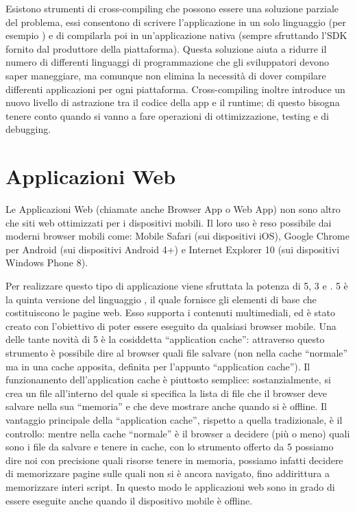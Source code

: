         Esistono strumenti di cross-com\-pil\-ing che possono essere una soluzione
        parziale del problema, essi consentono di scrivere l'applicazione in un solo
        linguaggio (per esempio \js{}) e di compilarla poi in un'applicazione
        nativa (sempre sfruttando l'SDK fornito dal produttore della
        piattaforma). Questa soluzione aiuta a ridurre il numero di differenti
        linguaggi di programmazione che gli sviluppatori devono saper maneggiare,
        ma comunque non elimina la necessità di dover compilare differenti
        applicazioni per ogni piattaforma. Cross-com\-pil\-ing inoltre introduce un
        nuovo livello di astrazione tra il codice della app e il run\-time; di
        questo bisogna tenere conto quando si vanno a fare operazioni di
        ottimizzazione, test\-ing e di de\-bug\-ging.

    \section{Applicazioni Web}
    \label{sec:webapp}
        Le Applicazioni Web (chiamate anche \mbox{Browser} App o Web App) non sono
        altro che siti web ottimizzati per i dispositivi mobili. Il loro uso è
        reso possibile dai moderni \mbox{browser} mobili come: Mobile Safari (sui
        dispositivi iOS), Google Chrome per Android (sui dispositivi Android 4+)
        e Internet Explorer 10 (sui dispositivi Windows Phone 8).\clearpage

        Per realizzare questo tipo di applicazione viene sfruttata la potenza di
        \html{}5, \css{}3 e \js{}. \html{}5 è la quinta versione del linguaggio
        \html{}, il quale fornisce gli elementi di base che costituiscono le pagine
        web. Esso supporta i contenuti multimediali, ed è stato creato con
        l'obiettivo di poter essere eseguito da qualsiasi \mbox{browser}
        mobile\citep{White:Native-vs-Html}. Una delle tante novità di \html{}5 è la
        cosiddetta ``ap\-pli\-ca\-tion \mbox{cache}'': attraverso questo strumento è
        possibile dire al \mbox{browser} quali file salvare (non nella \mbox{cache}
        ``normale'' ma in una \mbox{cache} apposita, definita per l'appunto
        ``ap\-pli\-ca\-tion \mbox{cache}''). Il funzionamento dell'ap\-pli\-ca\-tion \mbox{cache} è
        piuttosto semplice: sostanzialmente, si crea un file all'interno del
        quale si specifica la lista di file che il \mbox{browser} deve salvare nella
        sua ``memoria'' e che deve mostrare anche quando si è offline. Il
        vantaggio principale della ``ap\-pli\-ca\-tion \mbox{cache}'', rispetto a quella
        tradizionale, è il controllo: mentre nella \mbox{cache} ``normale'' è il
        \mbox{browser} a decidere (più o meno) quali sono i file da salvare e tenere in
        \mbox{cache}, con lo strumento offerto da \html{}5 possiamo dire noi con
        precisione quali risorse tenere in memoria, possiamo infatti decidere di
        memorizzare pagine sulle quali non si è ancora navigato, fino
        addirittura a memorizzare interi script. In questo modo le applicazioni
        web sono in grado di essere eseguite anche quando il dispositivo mobile
        è offline.

